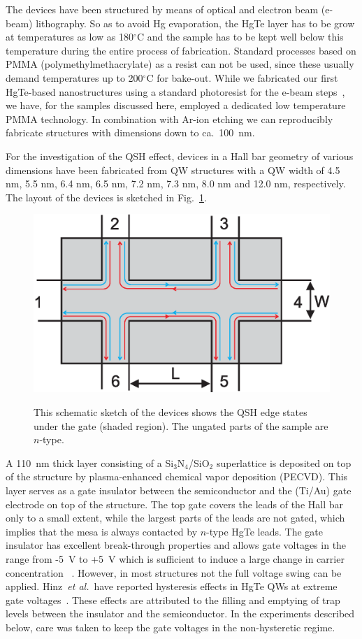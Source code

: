 \documentclass{article}
\newcommand{\etal}{\textit{et al.}}
\begin{document}
The devices have been structured by means of optical and electron
beam (e-beam) lithography. So as to avoid Hg evaporation, the HgTe
layer has to be grow at temperatures as low as 180$^{\circ}$C and
the sample has to be kept well below this temperature during the
entire process of fabrication. Standard processes based on PMMA
(polymethylmethacrylate) as a resist can not be used, since these
usually demand temperatures up to 200$^{\circ}$C for bake-out. While
we fabricated our first HgTe-based nanostructures using a standard
photoresist for the e-beam steps~\cite{Daumer03}, we have, for the
samples discussed here, employed a dedicated low temperature PMMA
technology. In combination with Ar-ion etching we can reproducibly
fabricate structures with dimensions down to ca.\ 100~nm.

For the investigation of the QSH effect, devices in a Hall bar
geometry of various dimensions have been fabricated from QW structures
with a QW width of 4.5 nm, 5.5 nm, 6.4 nm, 6.5 nm, 7.2 nm, 7.3 nm,
8.0 nm and 12.0 nm, respectively. The layout of the devices is
sketched in Fig.~\ref{FigHallbar}.
\begin{figure}[hbt]
\centering
 \includegraphics[width=0.8\linewidth]{80608Fig07.eps}\\
 \caption{This schematic sketch of the devices shows the QSH edge
 states under the gate (shaded region). The ungated parts of the
 sample are $n$-type.}\label{FigHallbar}
\end{figure}


A 110~nm thick layer consisting of a Si$_3$N$_4$/SiO$_2$
superlattice is deposited on top of the structure by plasma-enhanced
chemical vapor deposition (PECVD). This layer serves as a gate
insulator between the semiconductor and the (Ti/Au) gate electrode
on top of the structure. The top gate covers the leads of the Hall
bar only to a small extent, while the largest parts of the leads are
not gated, which implies that the mesa is always contacted by
$n$-type HgTe leads. The gate insulator has excellent break-through
properties and allows gate voltages in the range from -5~V to +5~V
which is sufficient to induce a large change in carrier
concentration ~\cite{Zhang01,Becker07}. However, in most structures
not the full voltage swing can be applied. Hinz~\etal\ have reported
hysteresis effects in HgTe QWs at extreme gate
voltages~\cite{Hinz06}. These effects are attributed to the filling
and emptying of trap levels between the insulator and the
semiconductor. In the experiments described below, care was taken to
keep the gate voltages in the non-hysteretic regime.
\end{document}
